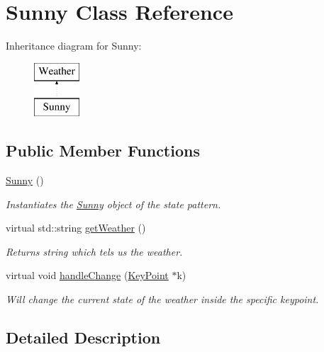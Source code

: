 \hypertarget{classSunny}{}\section{Sunny Class Reference}
\label{classSunny}
Inheritance diagram for Sunny\+:\begin{figure}[H]
\begin{center}
\leavevmode
\includegraphics[height=2.000000cm]{classSunny}
\end{center}
\end{figure}
\subsection*{Public Member Functions}
\begin{DoxyCompactItemize}
\item 
\mbox{\label{classSunny_a7f849e14ad8e3da056638135729f293d}} 
\hyperlink{classSunny_a7f849e14ad8e3da056638135729f293d}{Sunny} ()
\begin{DoxyCompactList}\small\item\em Instantiates the \hyperlink{classSunny}{Sunny} object of the state pattern. \end{DoxyCompactList}\item 
virtual std\+::string \hyperlink{classSunny_abcc09b207a37d95646b4267d9169693c}{get\+Weather} ()
\begin{DoxyCompactList}\small\item\em Returns string which tels us the weather. \end{DoxyCompactList}\item 
virtual void \hyperlink{classSunny_ad7e104164acc614157e6cec496a9db1a}{handle\+Change} (\hyperlink{classKeyPoint}{Key\+Point} $\ast$k)
\begin{DoxyCompactList}\small\item\em Will change the current state of the weather inside the specific keypoint. \end{DoxyCompactList}\end{DoxyCompactItemize}


\subsection{Detailed Description}



